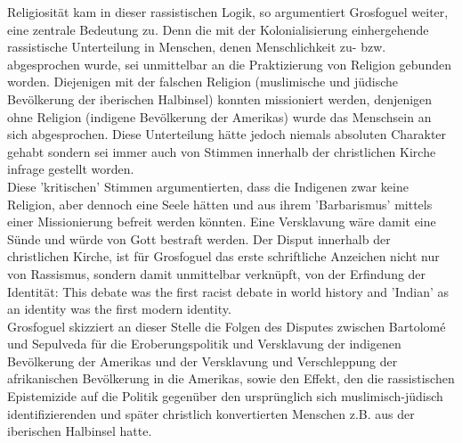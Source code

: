 \noindent Religiosität kam in dieser rassistischen Logik, so argumentiert Grosfoguel
weiter, eine zentrale Bedeutung zu. Denn die mit der Kolonialisierung
einhergehende rassistische Unterteilung in Menschen, denen Menschlichkeit zu-
bzw. abgesprochen wurde, sei unmittelbar an die Praktizierung von Religion
gebunden worden. Diejenigen mit der falschen Religion (muslimische und jüdische
Bevölkerung der iberischen Halbinsel) konnten missioniert werden, denjenigen
ohne Religion (indigene Bevölkerung der Amerikas) wurde das Menschsein an sich
abgesprochen.\footnotemark {} 
Diese Unterteilung hätte jedoch niemals absoluten Charakter
gehabt sondern sei immer auch von Stimmen innerhalb der christlichen Kirche
infrage gestellt worden.\\
Diese 'kritischen' Stimmen argumentierten, dass die Indigenen zwar keine
Religion, aber dennoch eine Seele hätten und aus ihrem 'Barbarismus' mittels
einer Missionierung befreit werden könnten.\footnotemark {}
Eine Versklavung wäre damit eine
Sünde und würde von Gott bestraft werden. Der Disput innerhalb der christlichen
Kirche, ist für Grosfoguel das erste schriftliche Anzeichen nicht nur von
Rassismus, sondern damit unmittelbar verknüpft, von der Erfindung der
Identität: \glqq This debate was the first racist debate in world history and
'Indian' as an identity was the first modern identity.\grqq \footnotemark
{} \\
Grosfoguel skizziert an dieser Stelle
die Folgen des Disputes zwischen Bartolomé und Sepulveda für die
Eroberungspolitik und Versklavung der indigenen Bevölkerung der Amerikas und
der Versklavung und Verschleppung der afrikanischen Bevölkerung in die
Amerikas, sowie den Effekt, den die rassistischen Epistemizide auf die Politik
gegenüber den ursprünglich sich muslimisch-jüdisch identifizierenden und später
christlich konvertierten Menschen z.B. aus der iberischen Halbinsel
hatte.\footnotemark {} \\


